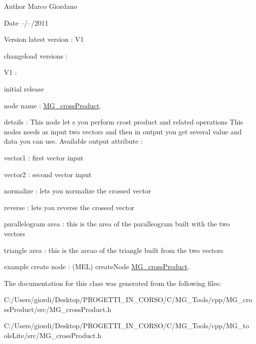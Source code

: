 \begin{DoxyAuthor}{Author}
Marco Giordano 
\end{DoxyAuthor}
\begin{DoxyDate}{Date}
--/--/2011 
\end{DoxyDate}
\begin{DoxyVersion}{Version}
latest version \-: V1 

changeload versions \-: \par
 V1 \-: \par

\begin{DoxyItemize}
\item initial release \par

\end{DoxyItemize}
\end{DoxyVersion}
node name \-: \hyperlink{class_m_g__cross_product}{M\-G\-\_\-cross\-Product}.

details \-: This node let s you perform crost product and related operations This nodes needs as input two vectors and then in output you get several value and data you can use. Available output attribute \-:
\begin{DoxyItemize}
\item vector1 \-: first vector input
\item vector2 \-: second vector input
\item normalize \-: lets you normalize the crossed vector
\item reverse \-: lets you reverse the crossed vector
\item parallelogram area \-: this is the area of the paralleogram built with the two vectors
\item triangle area \-: this is the areao of the triangle built from the two vectors
\end{DoxyItemize}

example create node \-: (M\-E\-L) create\-Node \hyperlink{class_m_g__cross_product}{M\-G\-\_\-cross\-Product}. 

The documentation for this class was generated from the following files\-:\begin{DoxyCompactItemize}
\item 
C\-:/\-Users/giordi/\-Desktop/\-P\-R\-O\-G\-E\-T\-T\-I\-\_\-\-I\-N\-\_\-\-C\-O\-R\-S\-O/\-C/\-M\-G\-\_\-\-Tools/cpp/\-M\-G\-\_\-cross\-Product/src/M\-G\-\_\-cross\-Product.\-h\item 
C\-:/\-Users/giordi/\-Desktop/\-P\-R\-O\-G\-E\-T\-T\-I\-\_\-\-I\-N\-\_\-\-C\-O\-R\-S\-O/\-C/\-M\-G\-\_\-\-Tools/cpp/\-M\-G\-\_\-tools\-Lite/src/M\-G\-\_\-cross\-Product.\-h\end{DoxyCompactItemize}
